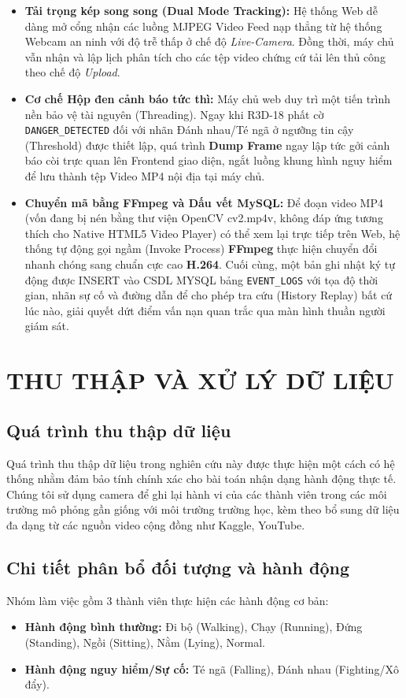 \documentclass[conference]{IEEEtran}
\begin{document}
\begin{itemize}
    \item \textbf{Tải trọng kép song song (Dual Mode Tracking):} Hệ thống Web dễ dàng mở cổng nhận các luồng MJPEG Video Feed nạp thẳng từ hệ thống Webcam an ninh với độ trễ thấp ở chế độ \textit{Live-Camera}. Đồng thời, máy chủ vẫn nhận và lập lịch phân tích cho các tệp video chứng cứ tải lên thủ công theo chế độ \textit{Upload}.
    \item \textbf{Cơ chế Hộp đen cảnh báo tức thì:} Máy chủ web duy trì một tiến trình nền bảo vệ tài nguyên (Threading). Ngay khi R3D-18 phất cờ \texttt{DANGER\_DETECTED} đối với nhãn Đánh nhau/Té ngã ở ngưỡng tin cậy (Threshold) được thiết lập, quá trình \textbf{Dump Frame} ngay lập tức gởi cảnh báo còi trực quan lên Frontend giao diện, ngắt luồng khung hình nguy hiểm để lưu thành tệp Video MP4 nội địa tại máy chủ.
    \item \textbf{Chuyển mã bằng FFmpeg và Dấu vết MySQL:} Để đoạn video MP4 (vốn đang bị nén bằng thư viện OpenCV cv2.mp4v, không đáp ứng tương thích cho Native HTML5 Video Player) có thể xem lại trực tiếp trên Web, hệ thống tự động gọi ngầm (Invoke Process) \textbf{FFmpeg} thực hiện chuyển đổi nhanh chóng sang chuẩn cực cao \textbf{H.264}. Cuối cùng, một bản ghi nhật ký tự động được INSERT vào CSDL MYSQL bảng \texttt{EVENT\_LOGS} với tọa độ thời gian, nhãn sự cố và đường dẫn để cho phép tra cứu (History Replay) bất cứ lúc nào, giải quyết dứt điểm vấn nạn quan trắc qua màn hình thuần người giám sát.
\end{itemize}

\section{THU THẬP VÀ XỬ LÝ DỮ LIỆU}
\subsection{Quá trình thu thập dữ liệu}
Quá trình thu thập dữ liệu trong nghiên cứu này được thực hiện một cách có hệ thống nhằm đảm bảo tính chính xác cho bài toán nhận dạng hành động thực tế. Chúng tôi sử dụng camera để ghi lại hành vi của các thành viên trong các môi trường mô phỏng gần giống với môi trường trường học, kèm theo bổ sung dữ liệu đa dạng từ các nguồn video cộng đồng như Kaggle, YouTube.

\subsection{Chi tiết phân bổ đối tượng và hành động}
Nhóm làm việc gồm 3 thành viên thực hiện các hành động cơ bản:
\begin{itemize}
    \item \textbf{Hành động bình thường:} Đi bộ (Walking), Chạy (Running), Đứng (Standing), Ngồi (Sitting), Nằm (Lying), Normal.
    \item \textbf{Hành động nguy hiểm/Sự cố:} Té ngã (Falling), Đánh nhau (Fighting/Xô đẩy).
\end{itemize}
\end{document}
